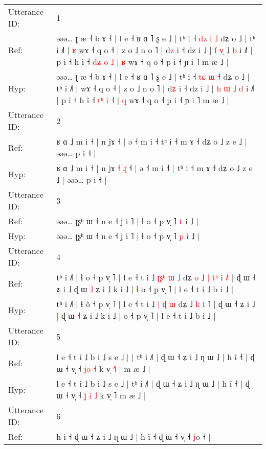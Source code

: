 \documentclass[10pt]{article}
\DeclareRobustCommand{\hl}[1]{{\textcolor{red}{#1}}}
\begin{document}
\begin{longtable}{ll}
\toprule
Utterance ID: & 1 \\
Ref: & əəə… ʈ æ ˧ b ɤ ˧ | l e ˧ ʁ ɑ ˥ ʂ e ˩ | tʰ i ˧ \hl{d}\hl{z} \hl{i} \hl{˩} dʑ o ˩ | tʰ i ˩˥ |\hl{ }\hl{ʁ} wɤ ˧ q o ˧ | z o ˩ n o ˥ | d\hl{z} i ˧ dz i ˩ | \hl{f} \hl{v}\hl{̩} ˩ \hl{b} i ˩˥ | p i ˧ h ĩ ˧ \hl{d}\hl{ʑ} \hl{o} \hl{˩} | \hl{ʁ} wɤ ˧ q o ˧ p i ˧ ɲ i ˥ m æ ˩ |
 \\
Hyp: & əəə… ʈ æ ˧ b ɤ ˧ | l e ˧ ʁ ɑ ˥ ʂ e ˩ | tʰ i ˧ \hl{t}\hl{ɕ} \hl{ɯ} \hl{˧} dʑ o ˩ | tʰ i ˩˥ |\hl{}\hl{} wɤ ˧ q o ˧ | z o ˩ n o ˥ | d\hl{ʑ} i ˧ dz i ˩ | \hl{h} \hl{}\hl{ɯ} ˩ \hl{d} i ˩˥ | p i ˧ h ĩ ˧ \hl{t}\hl{ʰ} \hl{i} \hl{˧} | \hl{q} wɤ ˧ q o ˧ p i ˧ ɲ i ˥ m æ ˩ |
 \\
\midrule
Utterance ID: & 2 \\
Ref: & ʁ ɑ ˩ m i ˧ | n jɤ\hl{}\hl{}\hl{}\hl{}\hl{} ˧ | ə ˧ m i ˧\hl{}\hl{} tʰ i ˧ m ɤ ˧ dʑ o ˩ z e ˩ | əəə… p i ˧ |
 \\
Hyp: & ʁ ɑ ˩ m i ˧ | n jɤ\hl{ }\hl{˧}\hl{ }\hl{ɻ}\hl{̍} ˧ | ə ˧ m i ˧\hl{ }\hl{|} tʰ i ˧ m ɤ ˧ dʑ o ˩ z e ˩ | əəə… p i ˧ |
 \\
\midrule
Utterance ID: & 3 \\
Ref: & əəə… ʈʂʰ ɯ ˧ n e ˧ ʝ i ˥ | ɬ o ˧ p v̩ ˥ \hl{t} i ˩ |
 \\
Hyp: & əəə… ʈʂʰ ɯ ˧ n e ˧ ʝ i ˥ | ɬ o ˧ p v̩ ˥ \hl{p} i ˩ |
 \\
\midrule
Utterance ID: & 4 \\
Ref: & tʰ i ˩˥ | ɬ o\hl{} ˧ p v̩ ˥ | l e ˧ t i ˩ \hl{ʈ}\hl{ʂ}\hl{ʰ} \hl{ɯ} \hl{˩} dʑ\hl{ }\hl{o} ˩\hl{ }\hl{|} \hl{t}\hl{ʰ} i \hl{˩}˥ | ɖ ɯ ˧ ʑ i ˩\hl{}\hl{} ɖ ɯ \hl{˩} ʑ i ˩ k i ˩ |\hl{ }\hl{ɬ} o ˧ p v̩ ˥ | l e ˧ t i ˩ b i ˩ |
 \\
Hyp: & tʰ i ˩˥ | ɬ o\hl{̃} ˧ p v̩ ˥ | l e ˧ t i ˩ \hl{}\hl{}\hl{|} \hl{ɖ} \hl{ɯ} dʑ\hl{}\hl{} ˩\hl{}\hl{} \hl{}\hl{k} i \hl{}˥ | ɖ ɯ ˧ ʑ i ˩\hl{ }\hl{|} ɖ ɯ \hl{˧} ʑ i ˩ k i ˩ |\hl{}\hl{} o ˧ p v̩ ˥ | l e ˧ t i ˩ b i ˩ |
 \\
\midrule
Utterance ID: & 5 \\
Ref: & l e ˧ t i ˩ b i ˩ s e ˩\hl{ }\hl{|} | tʰ i ˩˥ | ɖ ɯ ˧ ʑ i ˩ ɳ ɯ ˩ | h ĩ ˧ | ɖ ɯ ˧ v̩ ˧ \hl{}\hl{j}\hl{o} \hl{˧} k v̩ \hl{˧}˥\hl{ }\hl{|} m æ ˩ |
 \\
Hyp: & l e ˧ t i ˩ b i ˩ s e ˩\hl{}\hl{} | tʰ i ˩˥ | ɖ ɯ ˧ ʑ i ˩ ɳ ɯ ˩ | h ĩ ˧ | ɖ ɯ ˧ v̩ ˧ \hl{ʝ}\hl{ }\hl{i} \hl{˩} k v̩ \hl{}˥\hl{}\hl{} m æ ˩ |
 \\
\midrule
Utterance ID: & 6 \\
Ref: & h ĩ ˧\hl{}\hl{} ɖ ɯ ˧ ʑ i ˩ ɳ ɯ ˩ | h ĩ ˧\hl{}\hl{} ɖ ɯ ˧ v̩ ˧ \hl{}\hl{}\hl{j}o ˧ |

\end{longtable}
\end{document}
